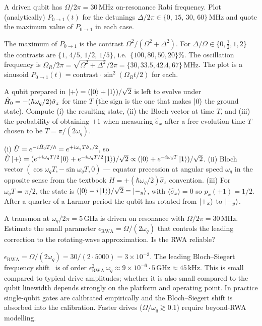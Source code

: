 \begin{exercise}
A driven qubit has $\Omega/2\pi=30\,\text{MHz}$ on-resonance Rabi
frequency. Plot (analytically) $P_{0\to1}(t)$ for the detunings
$\Delta/2\pi\in\{0,\,15,\,30,\,60\}\,\text{MHz}$ and quote the
maximum value of $P_{0\to1}$ in each case.
\begin{solution}
The maximum of $P_{0\to1}$ is the contrast
$\Omega^2/(\Omega^2+\Delta^2)$.
For $\Delta/\Omega\in\{0,\tfrac12,1,2\}$ the contrasts are
$\{1,\,4/5,\,1/2,\,1/5\}$, i.e.\ $\{100,80,50,20\}\%$. The
oscillation frequency is $\Omega_R/2\pi=\sqrt{\Omega^2+\Delta^2}/2\pi
=\{30,33.5,42.4,67\}\,\text{MHz}$. The plot is a sinusoid
$P_{0\to1}(t)=\text{contrast}\cdot\sin^2(\Omega_R t/2)$ for each.
\end{solution}
\end{exercise}

\begin{exercise}
A qubit prepared in $\ket{+}=(\ket{0}+\ket{1})/\sqrt 2$ is left to
evolve under $\hat{H}_0=-(\hbar\omega_q/2)\hat\sigma_z$ for time
$T$ (the sign is the one that makes $\ket{0}$ the ground state).
Compute (i) the resulting state, (ii) the Bloch vector at time
$T$, and (iii) the probability of obtaining $+1$ when measuring
$\hat\sigma_x$ after a free-evolution time $T$ chosen to be
$T=\pi/(2\omega_q)$.
\begin{solution}
(i) $\hat{U}=e^{-i\hat{H}_0 T/\hbar}=e^{+i\omega_q T\hat\sigma_z/2}$,
so
$\hat{U}\ket{+}=(e^{+i\omega_q T/2}\ket{0}+e^{-i\omega_q T/2}\ket{1})/\sqrt 2
\propto(\ket{0}+e^{-i\omega_q T}\ket{1})/\sqrt 2$.
(ii) Bloch vector $(\cos\omega_q T,-\sin\omega_q T,0)$ --- equator
precession at angular speed $\omega_q$ in the opposite sense from
the textbook $H=+(\hbar\omega_q/2)\hat\sigma_z$ convention.
(iii) For $\omega_q T=\pi/2$, the state is
$(\ket{0}-i\ket{1})/\sqrt 2=\ket{-_y}$, with
$\langle\hat\sigma_x\rangle=0$ so $p_x(+1)=1/2$. After a quarter
of a Larmor period the qubit has rotated from $\ket{+_x}$ to
$\ket{-_y}$.
\end{solution}
\end{exercise}

\begin{exercise}
A transmon at $\omega_q/2\pi=5\,\text{GHz}$ is driven on resonance
with $\Omega/2\pi=30\,\text{MHz}$. Estimate the small parameter
$\epsilon_\text{RWA}=\Omega/(2\omega_q)$ that controls the leading
correction to the rotating-wave approximation. Is the RWA reliable?
\begin{solution}
$\epsilon_\text{RWA}=\Omega/(2\omega_q)=30/(2\cdot 5000)=3\times 10^{-3}$.
The leading Bloch--Siegert frequency shift~\cite{blochsiegert1940} is of order
$\epsilon_\text{RWA}^2\,\omega_q\approx 9\times 10^{-6}\cdot 5\,\text{GHz}
\approx 45\,\text{kHz}$. This is small compared to typical drive
amplitudes; whether it is also small compared to the qubit
linewidth depends strongly on the platform and operating point.
In practice single-qubit gates are calibrated empirically and the
Bloch--Siegert shift is absorbed into the calibration. Faster
drives ($\Omega/\omega_q\gtrsim 0.1$) require beyond-RWA modelling.
\end{solution}
\end{exercise}
